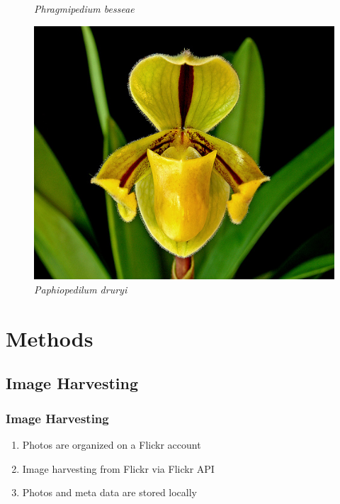 \documentclass[]{beamer}
\begin{document}
\begin{frame}
\begin{figure}[!htb]
              \caption*{\textit{Phragmipedium besseae}}
            \endminipage\hfill
              \includegraphics[width=\linewidth]{Paphiopedilum_druryi}
              \caption*{\textit{Paphiopedilum druryi}}
            \endminipage\hfill
        \end{figure}
    \end{frame}


\section{Methods}

    \subsection{Image Harvesting}

    \begin{frame}
        \frametitle{Image Harvesting}

        \begin{enumerate}
            \item Photos are organized on a Flickr account
            \item Image harvesting from Flickr via Flickr API
            \item Photos and meta data are stored locally
        \end{enumerate}
    \end{frame}
\end{document}
